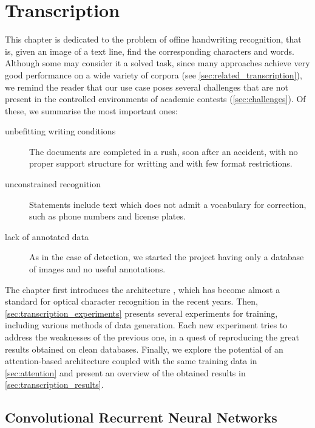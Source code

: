 
\chapter{Transcription}\label{ch:transcription}

This chapter is dedicated to the problem of offine handwriting recognition, that is, given an image of a text line, find the corresponding characters and words. Although some may consider it a solved task, since many approaches achieve very good performance on a wide variety of corpora (see \autoref{sec:related_transcription}), we remind the reader that our use case poses several challenges that are not present in the controlled environments of academic contests (\autoref{sec:challenges}). Of these, we summarise the most important ones:
\begin{description}
	\item[unbefitting writing conditions] The documents are completed in a rush, soon after an accident, with no proper support structure for writting and with few format restrictions.

	\item[unconstrained recognition] Statements include text which does not admit a vocabulary for correction, such as phone numbers and license plates.

	\item[lack of annotated data] As in the case of detection, we started the project having only a database of images and no useful annotations.
\end{description}

The chapter first introduces the \CRNN{} architecture \citep{CRNN}, which has become almost a standard for optical character recognition in the recent years. Then, \autoref{sec:transcription_experiments} presents several experiments for training, including various methods of data generation. Each new experiment tries to address the weaknesses of the previous one, in a quest of reproducing the great results obtained on clean databases. Finally, we explore the potential of an attention-based architecture coupled with the same training data in \autoref{sec:attention} and present an overview of the obtained results in \autoref{sec:transcription_results}.




\section{Convolutional Recurrent Neural Networks}\label{sec:crnn}

